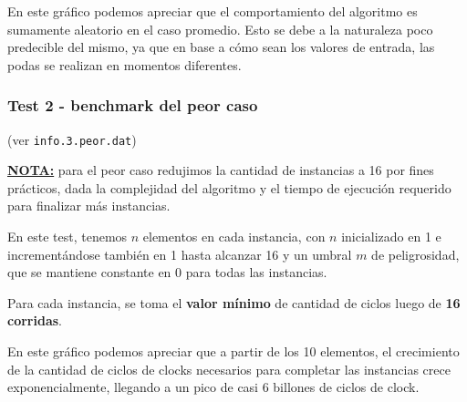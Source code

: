 \vspace*{0.5cm}


\vspace*{0.5cm}

En este gráfico podemos apreciar que el comportamiento del algoritmo es
sumamente aleatorio en el caso promedio. Esto se debe a la naturaleza poco
predecible del mismo, ya que en base a cómo sean los valores de entrada, las
podas se realizan en momentos diferentes.


\newpage
\subsubsection{Test 2 - benchmark del peor caso}

(ver \verb|info.3.peor.dat|) \medskip

\underline{\textbf{NOTA:}} para el peor caso redujimos la cantidad de instancias a 16 por fines prácticos, dada la complejidad
del algoritmo y el tiempo de ejecución requerido para finalizar más instancias. \medskip

En este test, tenemos $n$ elementos en cada instancia, con $n$ inicializado en 1 e incrementándose
también en 1 hasta alcanzar 16 y un umbral $m$ de peligrosidad, que se mantiene constante en 0 para todas las
instancias.

Para cada instancia, se toma el \textbf{valor mínimo} de cantidad de ciclos luego de \textbf{16 corridas}.

\vspace*{0.5cm}


\vspace*{0.5cm}

En este gráfico podemos apreciar que a partir de los 10 elementos, el
crecimiento de la cantidad de ciclos de clocks necesarios para completar las
instancias crece exponencialmente, llegando a un pico de casi 6 billones de
ciclos de clock.


